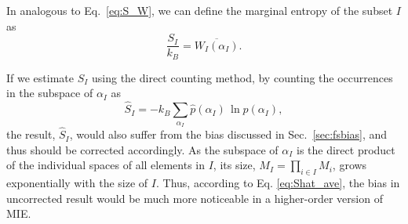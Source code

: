 \documentclass[preprint, superscriptaddress]{revtex4-1}
\begin{document}
In analogous to Eq.~\eqref{eq:S_W}, we can define
the marginal entropy of the subset $I$ as
$$
\frac{ S_I } { k_B } = \overline{ W_I(\alpha_I) }.
$$


If we estimate $S_I$ using the direct counting method,
by counting the occurrences in the subspace of $\alpha_I$ as
$$
\hat S_I = - k_B \sum_{\alpha_I} \hat p(\alpha_I) \, \ln p(\alpha_I),
$$
the result, $\hat S_I$, would also suffer from the bias discussed
in Sec.~\ref{sec:fsbias}, and thus should be corrected accordingly.
%
As the subspace of $\alpha_I$ is the direct product of
the individual spaces of all elements in $I$,
its size, $M_I = \prod_{i \in I} M_i$, grows exponentially with the size of $I$.
%
Thus, according to Eq. \eqref{eq:Shat_ave},
the bias in uncorrected result would be much more noticeable
in a higher-order version of MIE.



\end{document}
